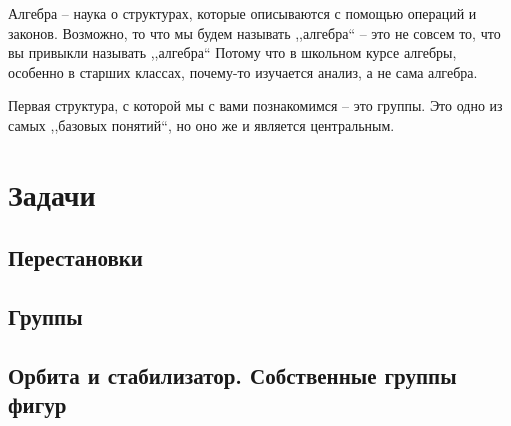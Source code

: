 \documentclass[10pt, twoside]{article}
\begin{document}
\pagestyle{empty}



\newpage

\tableofcontents
\newpage

\setcounter{page}{1}
\pagestyle{fancy}

Алгебра -- наука о структурах, которые описываются с помощью операций и законов. 
Возможно, то что мы будем называть ,,алгебра`` -- это не совсем то, что вы привыкли называть ,,алгебра`` 
Потому что в школьном курсе алгебры, особенно в старших классах, почему-то изучается анализ, а не сама алгебра.

Первая структура, с которой мы с вами познакомимся -- это группы.
Это одно из самых ,,базовых понятий``, но оно же и является центральным. 







\newpage
\renewcommand{\thesubsection}{\roman{subsection}}
\setcounter{subsection}{0}

\section*{Задачи}

\subsection{Перестановки}

\subsection{Группы}

\subsection{Орбита и стабилизатор. Собственные группы фигур}
\end{document}
